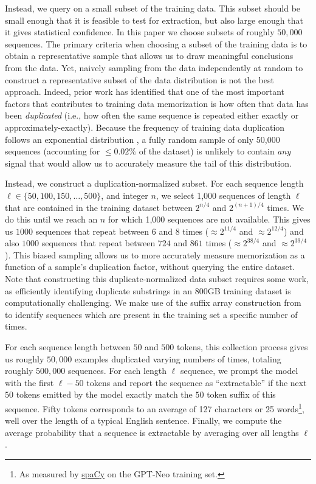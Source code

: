 Instead, we query on a small subset of the training data.
%
This subset should be small enough that it is feasible to test for extraction, 
but also large enough that
it gives statistical confidence.
%
In this paper we choose subsets of roughly $50{,}000$ sequences.
The primary criteria when choosing a subset of the training data is to obtain a representative sample that allows
us to draw meaningful conclusions from the data.
%
Yet, naively sampling from the data independently at random to construct a representative subset of the data distribution is not the best approach.
Indeed, prior work has identified that one of the most important factors that contributes to training data memorization is how often that data has been \emph{duplicated} (i.e., how often the same sequence is repeated either exactly or approximately-exactly).
%
Because the frequency of training data duplication follows an exponential distribution \citep{lee2021deduplicating}, a fully random sample of only 50,000 sequences
(accounting for $\le 0.02\%$ of the dataset)
is unlikely to contain \emph{any} signal that would allow us to 
accurately measure the tail of this distribution.




Instead, we construct a duplication-normalized subset.
%
For each sequence length $\ell \in \{50,100,150,\dots,500\}$,
and integer $n$,
we select 1,000 sequences of length $\ell$ that are contained in the training dataset between $2^{n/4}$ and $2^{(n+1)/4}$ times.
We do this until we reach an $n$ for which 1,000 sequences are not available.
%
This gives us $1000$ sequences that repeat between $6$ and $8$ times ($\approx 2^{11/4}$ and $\approx 2^{12/4}$) and also $1000$ sequences that repeat between $724$ and $861$ times ($\approx 2^{38/4}$ and $\approx 2^{39/4}$).
%
This biased sampling allows us to more accurately measure memorization as a function of a sample's duplication factor, without querying the entire dataset.
%
Note that constructing this duplicate-normalized data subset requires some work,
as efficiently identifying duplicate substrings in an $800$GB training dataset is
computationally challenging.
%
We make use of the suffix array construction from \citet{lee2021deduplicating} to identify sequences which are present in the training set a specific number of times.

For each sequence length between $50$ and $500$ tokens, this collection process gives us roughly $50,000$ examples duplicated varying numbers
of times,
totaling roughly $500{,}000$ sequences.
%
For each length $\ell$ sequence, we prompt the model with the first $\ell-50$ tokens and report the sequence
as ``extractable'' if the next $50$ tokens emitted by the model exactly match the $50$ token suffix of this sequence.
Fifty tokens corresponds to an average of 127 characters or 25 words\footnote{As measured by \href{https://spacy.io/}{spaCy} on the GPT-Neo training set.}, well over the length of a typical English sentence.
%
Finally, we compute the average probability that a sequence is extractable by averaging over all lengths $\ell$.


